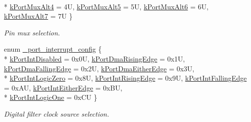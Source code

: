 \begin{DoxyCompactItemize}
\\*
\hyperlink{group__port__hal_ggac926cac9eed74e607a4034ce1e210cb7ab1a73de1236b3bc8c11c9e58a7f5460a}{k\+Port\+Mux\+Alt4} = 4U, 
\hyperlink{group__port__hal_ggac926cac9eed74e607a4034ce1e210cb7aa157f20022a2063dadec850b08c524ee}{k\+Port\+Mux\+Alt5} = 5U, 
\hyperlink{group__port__hal_ggac926cac9eed74e607a4034ce1e210cb7a8038c7f9706bbe3da881a022b09e6f4f}{k\+Port\+Mux\+Alt6} = 6U, 
\hyperlink{group__port__hal_ggac926cac9eed74e607a4034ce1e210cb7a069866a50983e744730a2cae5024554d}{k\+Port\+Mux\+Alt7} = 7U
 \}\begin{DoxyCompactList}\small\item\em Pin mux selection. \end{DoxyCompactList}
\item 
enum \hyperlink{group__port__hal_ga3d53eb7c567ef2777ecdd7d146381bcf}{\+\_\+port\+\_\+interrupt\+\_\+config} \{ \\*
\hyperlink{group__port__hal_gga3d53eb7c567ef2777ecdd7d146381bcfad44edc3e518db6a9efc1f8e686b42d49}{k\+Port\+Int\+Disabled} = 0x0U, 
\hyperlink{group__port__hal_gga3d53eb7c567ef2777ecdd7d146381bcfa3dd56f87ed9406d32908fb459a1542ed}{k\+Port\+Dma\+Rising\+Edge} = 0x1U, 
\hyperlink{group__port__hal_gga3d53eb7c567ef2777ecdd7d146381bcfaf3094573751eff0fd41e2a4707c133d1}{k\+Port\+Dma\+Falling\+Edge} = 0x2U, 
\hyperlink{group__port__hal_gga3d53eb7c567ef2777ecdd7d146381bcfa8cd931b077ea5a44ad4c52d263ca668e}{k\+Port\+Dma\+Either\+Edge} = 0x3U, 
\\*
\hyperlink{group__port__hal_gga3d53eb7c567ef2777ecdd7d146381bcfa0f6629c695325124029f99bc6c54fce6}{k\+Port\+Int\+Logic\+Zero} = 0x8U, 
\hyperlink{group__port__hal_gga3d53eb7c567ef2777ecdd7d146381bcfa3b327664a345fee878e0d231f8ef55c8}{k\+Port\+Int\+Rising\+Edge} = 0x9U, 
\hyperlink{group__port__hal_gga3d53eb7c567ef2777ecdd7d146381bcfa02419142025b0b094fe741a082cefbbb}{k\+Port\+Int\+Falling\+Edge} = 0x\+AU, 
\hyperlink{group__port__hal_gga3d53eb7c567ef2777ecdd7d146381bcfa04e676a9e360dca3fa773d7f140a6e11}{k\+Port\+Int\+Either\+Edge} = 0x\+BU, 
\\*
\hyperlink{group__port__hal_gga3d53eb7c567ef2777ecdd7d146381bcfa8524e6c7b0ea170e3094c1db94500493}{k\+Port\+Int\+Logic\+One} = 0x\+CU
 \}\begin{DoxyCompactList}\small\item\em Digital filter clock source selection. \end{DoxyCompactList}
\end{DoxyCompactItemize}
